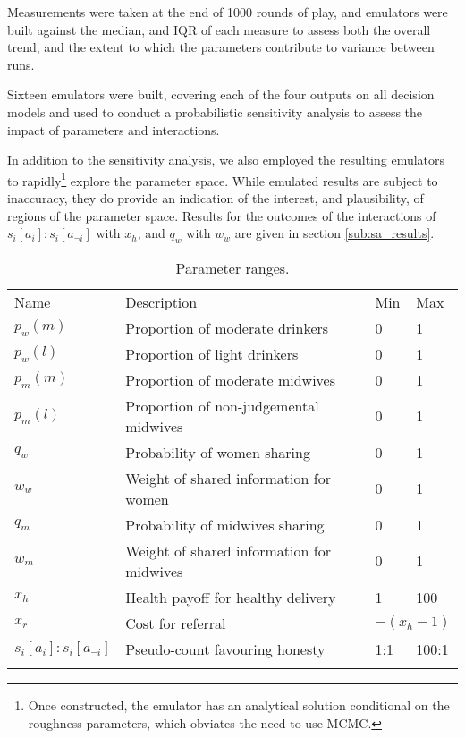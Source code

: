 Measurements were taken at the end of 1000 rounds of play, and emulators were built against the median, and \ac{IQR} of each measure to assess both the overall trend, and the extent to which the parameters contribute to variance between runs.

Sixteen emulators were built, covering each of the four outputs on all decision models and used to conduct a probabilistic sensitivity analysis to assess the impact of parameters and interactions.

In addition to the sensitivity analysis, we also employed the resulting emulators to rapidly\footnote{Once constructed, the emulator has an analytical solution conditional on the roughness parameters, which obviates the need to use MCMC.} explore the parameter space. While emulated results are subject to inaccuracy, they do provide an indication of the interest, and plausibility, of regions of the parameter space. Results for the outcomes of the interactions of \(s_{i}[a_{i}]:s_{i}[a_{\neg i}]\) with \(x_{h}\), and \(q_{w}\) with \(w_{w}\) are given in section \ref{sub:sa_results}.

\begin{table}
\caption{Parameter ranges.}
\label{tab:sa_params}
\begin{tabular} {llll}
\hline\noalign{\smallskip}
Name & Description & Min & Max \\
\noalign{\smallskip}\svhline\noalign{\smallskip}
\(p_{w}(m)\) & Proportion of moderate drinkers & 0 & 1 \\ 
\(p_{w}(l)\) & Proportion of light drinkers & 0 & 1 \\ 
\(p_{m}(m)\) & Proportion of moderate midwives & 0 & 1 \\ 
\(p_{m}(l)\) & Proportion of non-judgemental midwives & 0 & 1 \\ 
\(q_{w}\) & Probability of women sharing & 0 & 1 \\ 
\(w_{w}\) & Weight of shared information for women & 0 & 1 \\ 
\(q_{m}\) & Probability of midwives sharing & 0 & 1 \\ 
\(w_{m}\) & Weight of shared information for midwives & 0 & 1 \\ 
\(x_{h}\) & Health payoff for healthy delivery & 1 & 100 \\ 
\(x_{r}\) & Cost for referral & \multicolumn{2}{l}{\(-(x_{h} - 1)\)} \\ 
\(s_{i}[a_{i}]:s_{i}[a_{\neg i}]\) & Pseudo-count favouring honesty & 1:1 & 100:1 \\
\noalign{\smallskip}\hline\noalign{\smallskip}
\end{tabular}
\end{table}